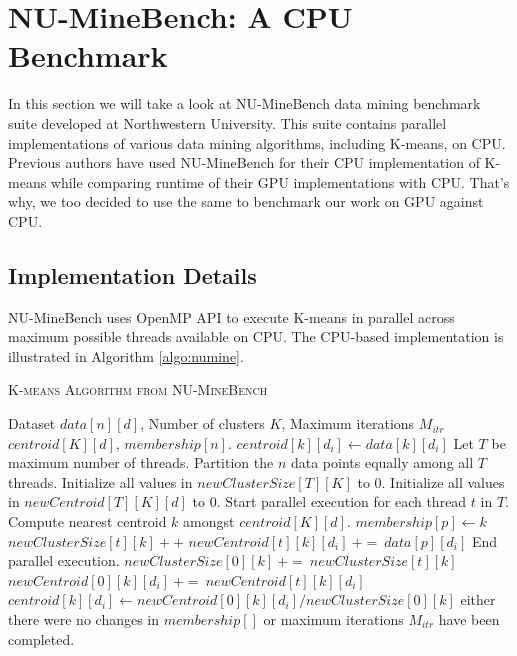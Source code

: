 \section{NU-MineBench: A CPU Benchmark}
In this section we will take a look at NU-MineBench data mining benchmark suite \cite{numine} developed at Northwestern University. This suite contains parallel implementations of various data mining algorithms, including K-means, on CPU. Previous authors \cite{gpuminer, che_et_al, wu_hp} have used NU-MineBench for their CPU implementation of K-means while comparing runtime of their GPU implementations with CPU. That's why, we too decided to use the same to benchmark our work on GPU against CPU. 

\subsection{Implementation Details}
NU-MineBench uses OpenMP API \cite{openmp} to execute K-means in parallel across maximum possible threads available on CPU. The CPU-based implementation is illustrated in Algorithm \ref{algo:numine}.

\begin{algorithm} 
\caption{\textsc{K-means Algorithm from NU-MineBench}}
\label{algo:numine}
\begin{algorithmic}[1]
\REQUIRE Dataset $data[n][d]$, Number of clusters $K$, Maximum iterations $M_{itr}$
\ENSURE $centroid[K][d]$, $membership[n]$.
 \label{algo:numine:init}
		\STATE $centroid[k][d_{i}] \gets data[k][d_{i}]$
	\ENDFOR
\ENDFOR
\STATE Let $T$ be maximum number of threads.
\REPEAT
\STATE Partition the $n$ data points equally among all $T$ threads. \label{algo:numine:nearest}
\STATE Initialize all values in $newClusterSize[T][K]$ to $0$.
\STATE Initialize all values in $newCentroid[T][K][d]$ to $0$.
\STATE Start parallel execution for each thread $t$ in $T$.
	\STATE Compute nearest centroid $k$ amongst $centroid[K][d]$.
	\STATE $membership[p] \gets k$
	\STATE $newClusterSize[t][k]{+}{+}$
		\STATE $newCentroid[t][k][d_{i}]\ {+}{=}\ data[p][d_{i}]$
	\ENDFOR
\ENDFOR	
\STATE End parallel execution.
 \label{algo:numine:compute}
		\STATE $newClusterSize[0][k]\ {+}{=}\ newClusterSize[t][k]$
			\STATE $newCentroid[0][k][d_{i}]\ {+}{=}\ newCentroid[t][k][d_{i}]$
			\STATE $centroid[k][d_{i}] \gets newCentroid[0][k][d_{i}] / newClusterSize[0][k]$
		\ENDFOR
	\ENDFOR
\ENDFOR
\UNTIL either there were no changes in $membership[]$ or maximum iterations $M_{itr}$ have been completed. \label{algo:numine:term}
\end{algorithmic}
\end{algorithm}


